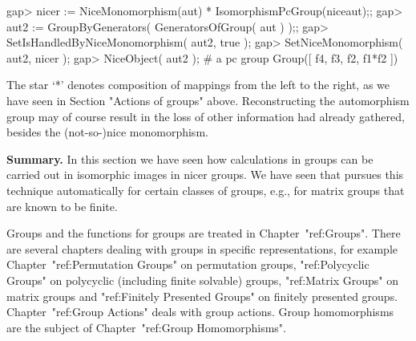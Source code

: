 \beginexample
gap> nicer := NiceMonomorphism(aut) * IsomorphismPcGroup(niceaut);;
gap> aut2 := GroupByGenerators( GeneratorsOfGroup( aut ) );;
gap> SetIsHandledByNiceMonomorphism( aut2, true );
gap> SetNiceMonomorphism( aut2, nicer );
gap> NiceObject( aut2 );  # a pc group
Group([ f4, f3, f2, f1*f2 ])
\endexample

The star `*' denotes composition of mappings  from the left to the right,
as we  have  seen in  Section "Actions of  groups" above.
Reconstructing the
automorphism group may of course result in the  loss of other information
{\GAP} had already gathered, besides the (not-so-)nice monomorphism.

%

{\bf Summary.}  In this section we have  seen  how calculations in groups
can be carried  out in isomorphic  images in  nicer groups. We  have seen
that {\GAP}  pursues this technique  automatically for certain classes of
groups, e.g., for matrix groups that are known to be finite.


Groups and the functions for groups are treated in Chapter~"ref:Groups".
There are several chapters dealing with groups in specific representations,
for example Chapter~"ref:Permutation Groups" on permutation groups,
"ref:Polycyclic Groups" on polycyclic (including finite solvable) groups,
"ref:Matrix Groups" on matrix groups and "ref:Finitely Presented Groups" on
finitely presented groups.
Chapter~"ref:Group Actions" deals with group actions. Group
homomorphisms are the subject of Chapter~"ref:Group Homomorphisms".


